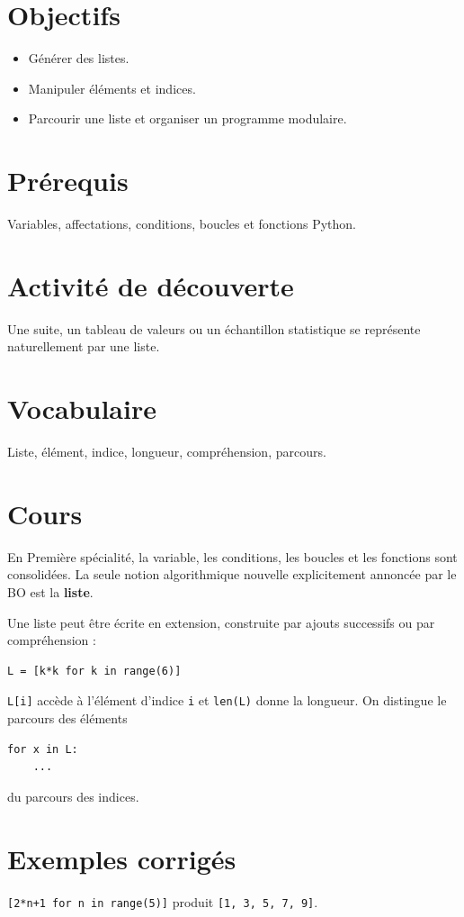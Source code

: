 \section{Objectifs}
\begin{itemize}
\item Générer des listes.
\item Manipuler éléments et indices.
\item Parcourir une liste et organiser un programme modulaire.
\end{itemize}

\section{Prérequis}
Variables, affectations, conditions, boucles et fonctions Python.

\section{Activité de découverte}
Une suite, un tableau de valeurs ou un échantillon statistique se représente naturellement par une liste.

\section{Vocabulaire}
Liste, élément, indice, longueur, compréhension, parcours.

\section{Cours}
En Première spécialité, la variable, les conditions, les boucles et les fonctions sont consolidées. La seule notion algorithmique nouvelle explicitement annoncée par le BO est la \textbf{liste}.

Une liste peut être écrite en extension, construite par ajouts successifs ou par compréhension :
\begin{verbatim}
L = [k*k for k in range(6)]
\end{verbatim}

\texttt{L[i]} accède à l’élément d’indice \texttt{i} et \texttt{len(L)} donne la longueur. On distingue le parcours des éléments
\begin{verbatim}
for x in L:
    ...
\end{verbatim}
du parcours des indices.

\section{Exemples corrigés}
\texttt{[2*n+1 for n in range(5)]} produit \texttt{[1, 3, 5, 7, 9]}.

